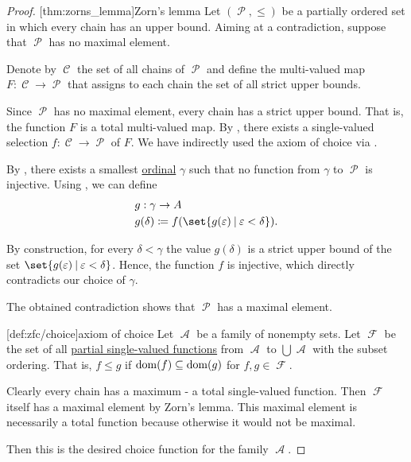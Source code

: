 \begin{proof}
  [thm:zorns_lemma]{Zorn's lemma} Let \( (\mscrP, \leq) \) be a partially ordered set in which every chain has an upper bound. Aiming at a contradiction, suppose that \( \mscrP \) has no maximal element.

  Denote by \( \mscrC \) the set of all chains of \( \mscrP \) and define the multi-valued map \( F: \mscrC \to \mscrP \) that assigns to each chain the set of all strict upper bounds.

  Since \( \mscrP \) has no maximal element, every chain has a strict upper bound. That is, the function \( F \) is a total multi-valued map. By , there exists a single-valued selection \( f: \mscrC \to \mscrP \) of \( F \). We have indirectly used the axiom of choice via .

  By , there exists a smallest \hyperref[def:ordinal]{ordinal} \( \gamma \) such that no function from \( \gamma \) to \( \mscrP \) is injective. Using , we can define
  \begin{equation*}
    \begin{aligned}
      &g: \gamma \to A \\
      &g(\delta) \coloneqq f(\set{ g(\varepsilon) \given \varepsilon < \delta }).
    \end{aligned}
  \end{equation*}

  By construction, for every \( \delta < \gamma \) the value \( g(\delta) \) is a strict upper bound of the set \( \set{ g(\varepsilon) \given \varepsilon < \delta } \). Hence, the function \( f \) is injective, which directly contradicts our choice of \( \gamma \).

  The obtained contradiction shows that \( \mscrP \) has a maximal element.

  [def:zfc/choice]{axiom of choice} Let \( \mscrA \) be a family of nonempty sets. Let \( \mscrF \) be the set of all \hyperref[def:partial_function]{partial single-valued functions} from \( \mscrA \) to \( \bigcup \mscrA \) with the subset ordering. That is, \( f \leq g \) if \( \operatorname{dom}(f) \subseteq \operatorname{dom}(g) \) for \( f, g \in \mscrF \).

  Clearly every chain has a maximum - a total single-valued function. Then \( \mscrF \) itself has a maximal element by Zorn's lemma. This maximal element is necessarily a total function because otherwise it would not be maximal.

  Then this is the desired choice function for the family \( \mscrA \).
\end{proof}
